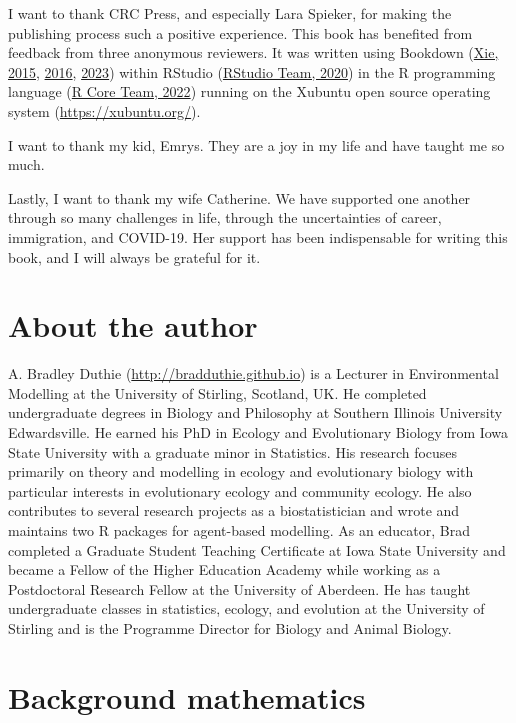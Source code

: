 \documentclass[
  openany]{krantz}
\begin{document}
I want to thank CRC Press, and especially Lara Spieker, for making the publishing process such a positive experience.
This book has benefited from feedback from three anonymous reviewers.
It was written using Bookdown (\protect\hyperlink{ref-xie2015}{Xie, 2015}, \protect\hyperlink{ref-Xie2016}{2016}, \protect\hyperlink{ref-Xie2023}{2023}) within RStudio (\protect\hyperlink{ref-Rstudio}{RStudio Team, 2020}) in the R programming language (\protect\hyperlink{ref-Rproject}{R Core Team, 2022}) running on the Xubuntu open source operating system (\url{https://xubuntu.org/}).

I want to thank my kid, Emrys.
They are a joy in my life and have taught me so much.

Lastly, I want to thank my wife Catherine.
We have supported one another through so many challenges in life, through the uncertainties of career, immigration, and COVID-19.
Her support has been indispensable for writing this book, and I will always be grateful for it.

\clearpage

\hypertarget{author}{%
\chapter*{About the author}\label{author}}


A. Bradley Duthie (\url{http://bradduthie.github.io}) is a Lecturer in Environmental Modelling at the University of Stirling, Scotland, UK.
He completed undergraduate degrees in Biology and Philosophy at Southern Illinois University Edwardsville.
He earned his PhD in Ecology and Evolutionary Biology from Iowa State University with a graduate minor in Statistics.
His research focuses primarily on theory and modelling in ecology and evolutionary biology with particular interests in evolutionary ecology and community ecology.
He also contributes to several research projects as a biostatistician and wrote and maintains two R packages for agent-based modelling.
As an educator, Brad completed a Graduate Student Teaching Certificate at Iowa State University and became a Fellow of the Higher Education Academy while working as a Postdoctoral Research Fellow at the University of Aberdeen.
He has taught undergraduate classes in statistics, ecology, and evolution at the University of Stirling and is the Programme Director for Biology and Animal Biology.

\mainmatter

\hypertarget{Chapter_1}{%
\chapter{Background mathematics}\label{Chapter_1}}
\end{document}
